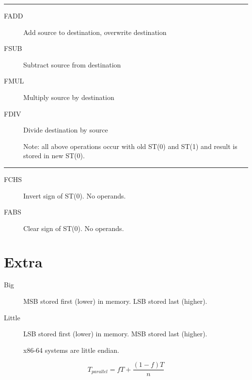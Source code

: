\documentclass[10pt,landscape]{article}
\newcommand{\mysep}{\vspace{0.1cm}\hrule\vspace{0.1cm}}
\begin{document}
\begin{multicols*}{3}
\mysep

\begin{description}
	\item[FADD] Add source to destination, overwrite destination
	\item[FSUB] Subtract source from destination
	\item[FMUL] Multiply source by destination
	\item[FDIV] Divide destination by source
	\item[] Note: all above operations occur with old ST(0) and ST(1) and result
		is stored in new ST(0). 
\end{description}

\mysep

\begin{description}
	\item[FCHS] Invert sign of ST(0). No operands.
	\item[FABS] Clear sign of ST(0). No operands.
\end{description}

\section{Extra}

\begin{description}
  \item[Big] MSB stored first (lower) in memory. LSB stored last (higher).
  \item[Little] LSB stored first (lower) in memory. MSB stored last (higher).
	\item[] x86-64 systems are little endian.
\end{description}

$$T_{parallel} = fT + \frac{(1-f)T}{n}$$

\end{multicols*}
\end{document}
